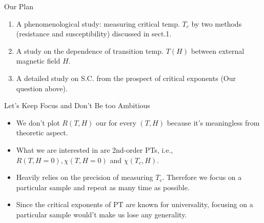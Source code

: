 \documentclass[aspectratio=1610,14pt]{beamer}
\begin{document}
\begin{frame}{Our Plan}
\begin{enumerate}
\item
A phenomenological study: measuring critical temp. $T_c$ by two methods (resistance and susceptibility) discussed in sect.1.
\item
A study on the dependence of transition temp. $T(H)$ between external magnetic field $H$.
\item A detailed study on S.C. from the prospect of critical exponents (Our question above).
\end{enumerate}

\end{frame}

\begin{frame}{Let's Keep Focus and Don't Be too Ambitious}
\begin{itemize}
\item
We don't plot $R(T,H)$ our for every $(T,H)$ because it's meaningless from theoretic aspect.
\item
What we are interested in are 2nd-order PTs, i.e., $R(T,H=0),\chi(T,H=0)$ and $\chi(T_c,H)$.
\item
Heavily relies on the precision of measuring $T_c$. Therefore we focus on a particular sample and repeat as many time as possible.
\item
Since the critical exponents of PT are known for universality, focusing on a particular sample would't make us lose any generality.
\end{itemize}

\end{frame}
\end{document}

